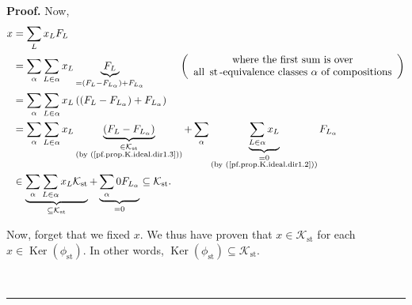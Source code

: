 \documentclass[numbers=enddot,12pt,final,onecolumn,notitlepage]{scrartcl}%
\theoremstyle{definition}
\newenvironment{proof}[1][Proof]{\noindent\textbf{#1.} }{\ \rule{0.5em}{0.5em}}
\newenvironment{verlong}{}{}
\let\sumnonlimits\sum
\renewcommand{\sum}{\sumnonlimits\limits}
\begin{document}
\begin{verlong}
\begin{proof}
Now,%
\begin{align*}
x  &  =\sum_{L}x_{L}F_{L}\\
&  =\sum_{\alpha}\sum_{L\in\alpha}x_{L}\underbrace{F_{L}}_{=\left(
F_{L}-F_{L_{\alpha}}\right)  +F_{L_{\alpha}}}\ \ \ \ \ \ \ \ \ \ \left(
\begin{array}
[c]{c}%
\text{where the first sum is over}\\
\text{all }\operatorname*{st}\text{-equivalence classes }\alpha\text{ of
compositions}%
\end{array}
\right) \\
&  =\sum_{\alpha}\sum_{L\in\alpha}x_{L}\left(  \left(  F_{L}-F_{L_{\alpha}%
}\right)  +F_{L_{\alpha}}\right) \\
&  =\sum_{\alpha}\sum_{L\in\alpha}x_{L}\underbrace{\left(  F_{L}-F_{L_{\alpha
}}\right)  }_{\substack{\in\mathcal{K}_{\operatorname*{st}}\\\text{(by
(\ref{pf.prop.K.ideal.dir1.3}))}}}+\sum_{\alpha}\underbrace{\sum_{L\in\alpha
}x_{L}}_{\substack{=0\\\text{(by (\ref{pf.prop.K.ideal.dir1.2}))}%
}}F_{L_{\alpha}}\\
&  \in\underbrace{\sum_{\alpha}\sum_{L\in\alpha}x_{L}\mathcal{K}%
_{\operatorname*{st}}}_{\subseteq\mathcal{K}_{\operatorname*{st}}%
}+\underbrace{\sum_{\alpha}0F_{L_{\alpha}}}_{=0}\subseteq\mathcal{K}%
_{\operatorname*{st}}.
\end{align*}


Now, forget that we fixed $x$. We thus have proven that $x\in\mathcal{K}%
_{\operatorname*{st}}$ for each $x\in\operatorname*{Ker}\left(  \phi
_{\operatorname*{st}}\right)  $. In other words, $\operatorname*{Ker}\left(
\phi_{\operatorname*{st}}\right)  \subseteq\mathcal{K}_{\operatorname*{st}}$.


\end{proof}
\end{verlong}
\end{document}
